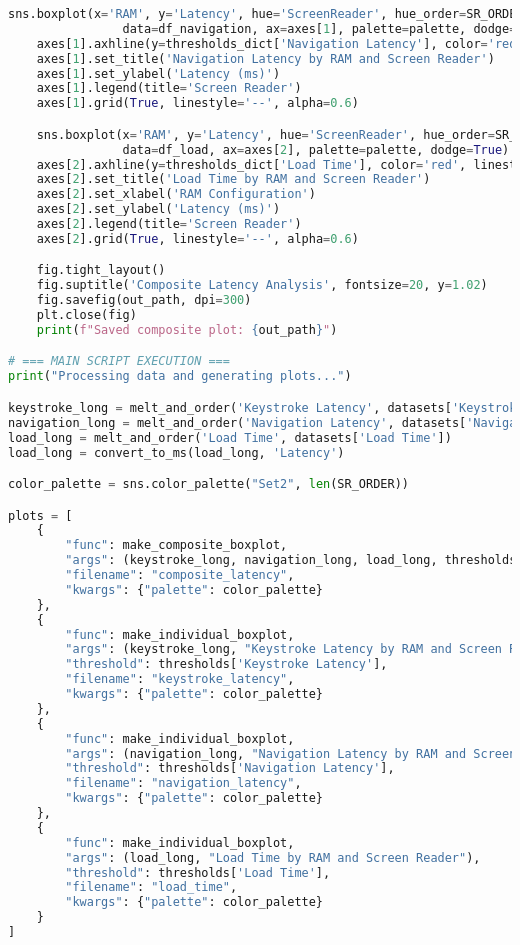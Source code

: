 \begin{lstlisting}[language=Python]
    sns.boxplot(x='RAM', y='Latency', hue='ScreenReader', hue_order=SR_ORDER,
                data=df_navigation, ax=axes[1], palette=palette, dodge=True)
    axes[1].axhline(y=thresholds_dict['Navigation Latency'], color='red', linestyle='--')
    axes[1].set_title('Navigation Latency by RAM and Screen Reader')
    axes[1].set_ylabel('Latency (ms)')
    axes[1].legend(title='Screen Reader')
    axes[1].grid(True, linestyle='--', alpha=0.6)

    sns.boxplot(x='RAM', y='Latency', hue='ScreenReader', hue_order=SR_ORDER,
                data=df_load, ax=axes[2], palette=palette, dodge=True)
    axes[2].axhline(y=thresholds_dict['Load Time'], color='red', linestyle='--')
    axes[2].set_title('Load Time by RAM and Screen Reader')
    axes[2].set_xlabel('RAM Configuration')
    axes[2].set_ylabel('Latency (ms)')
    axes[2].legend(title='Screen Reader')
    axes[2].grid(True, linestyle='--', alpha=0.6)

    fig.tight_layout()
    fig.suptitle('Composite Latency Analysis', fontsize=20, y=1.02)
    fig.savefig(out_path, dpi=300)
    plt.close(fig)
    print(f"Saved composite plot: {out_path}")

# === MAIN SCRIPT EXECUTION ===
print("Processing data and generating plots...")

keystroke_long = melt_and_order('Keystroke Latency', datasets['Keystroke Response'])
navigation_long = melt_and_order('Navigation Latency', datasets['Navigation Commands'])
load_long = melt_and_order('Load Time', datasets['Load Time'])
load_long = convert_to_ms(load_long, 'Latency')

color_palette = sns.color_palette("Set2", len(SR_ORDER))

plots = [
    {
        "func": make_composite_boxplot,
        "args": (keystroke_long, navigation_long, load_long, thresholds),
        "filename": "composite_latency",
        "kwargs": {"palette": color_palette}
    },
    {
        "func": make_individual_boxplot,
        "args": (keystroke_long, "Keystroke Latency by RAM and Screen Reader"),
        "threshold": thresholds['Keystroke Latency'],
        "filename": "keystroke_latency",
        "kwargs": {"palette": color_palette}
    },
    {
        "func": make_individual_boxplot,
        "args": (navigation_long, "Navigation Latency by RAM and Screen Reader"),
        "threshold": thresholds['Navigation Latency'],
        "filename": "navigation_latency",
        "kwargs": {"palette": color_palette}
    },
    {
        "func": make_individual_boxplot,
        "args": (load_long, "Load Time by RAM and Screen Reader"),
        "threshold": thresholds['Load Time'],
        "filename": "load_time",
        "kwargs": {"palette": color_palette}
    }
]




\end{lstlisting}

